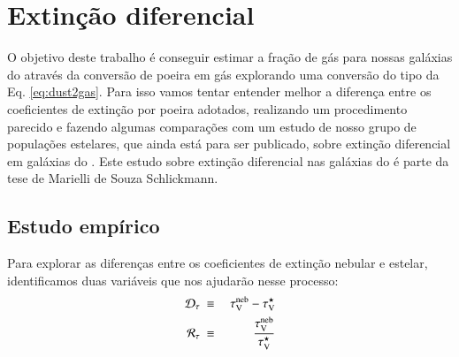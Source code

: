 



\chapter{Extinção diferencial}
\label{sec:difextin}

O objetivo deste trabalho é conseguir estimar a fração de gás para nossas galáxias do \CAL através
da conversão de poeira em gás explorando uma conversão do tipo da Eq. \ref{eq:dust2gas}. Para isso
vamos tentar entender melhor a diferença entre os coeficientes de extinção por poeira adotados,
realizando um procedimento parecido e fazendo algumas comparações com um estudo de nosso grupo de
populações estelares, que ainda está para ser publicado, sobre extinção diferencial em galáxias do
\SDSS. Este estudo sobre extinção diferencial nas galáxias do \SDSS é parte da tese de Marielli de
Souza Schlickmann.

\section{Estudo empírico}
\label{sec:difextin:emp}

Para explorar as diferenças entre os coeficientes de extinção nebular e estelar, identificamos duas
variáveis que nos ajudarão nesse processo:
\begin{eqnarray}
	\mathcal{D}_\tau\ &\equiv&\ \tau_{\mathrm{V}}^{\mathrm{neb}} - \tau_{\mathrm{V}}^\star \\
	\label{eq:difftau}
	\mathcal{R}_\tau\ &\equiv&\ \frac{\tau_{\mathrm{V}}^{\mathrm{neb}}}{\tau_{\mathrm{V}}^\star} 
	\label{eq:ratiotau}
\end{eqnarray}

